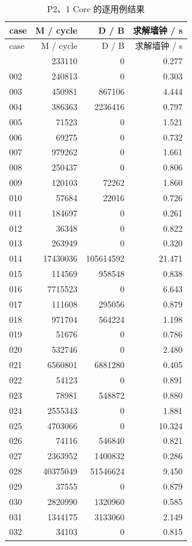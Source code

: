 \documentclass[anonymous,notoc]{gmcm2026}
\begin{document}
\begin{longtable}{lrrr}
\caption{P2、1 Core 的逐用例结果}\\
\toprule
case & M / cycle & D / B & 求解墙钟 / s\\\midrule
\endfirsthead
\toprule
case & M / cycle & D / B & 求解墙钟 / s\\\midrule
\endhead
\bottomrule\endfoot
001 & 233110 & 0 & 0.277 \\
002 & 240813 & 0 & 0.303 \\
003 & 450981 & 867106 & 4.444 \\
004 & 386363 & 2236416 & 0.797 \\
005 & 71523 & 0 & 1.521 \\
006 & 69275 & 0 & 0.732 \\
007 & 979262 & 0 & 1.661 \\
008 & 250437 & 0 & 0.806 \\
009 & 120103 & 72262 & 1.860 \\
010 & 57684 & 22016 & 0.726 \\
011 & 184697 & 0 & 0.261 \\
012 & 36348 & 0 & 0.822 \\
013 & 263949 & 0 & 0.320 \\
014 & 17430036 & 105614592 & 21.471 \\
015 & 114569 & 958548 & 0.838 \\
016 & 7715523 & 0 & 6.643 \\
017 & 111608 & 295056 & 0.879 \\
018 & 971704 & 564224 & 1.198 \\
019 & 51676 & 0 & 0.786 \\
020 & 532746 & 0 & 2.480 \\
021 & 6560801 & 6881280 & 0.405 \\
022 & 54123 & 0 & 0.891 \\
023 & 78981 & 548872 & 0.880 \\
024 & 2555343 & 0 & 1.881 \\
025 & 4703066 & 0 & 10.324 \\
026 & 74116 & 546840 & 0.821 \\
027 & 2363952 & 1400832 & 0.286 \\
028 & 40375049 & 51546624 & 9.450 \\
029 & 37555 & 0 & 0.879 \\
030 & 2820990 & 1320960 & 0.585 \\
031 & 1344175 & 3133060 & 2.149 \\
032 & 34103 & 0 & 0.815 \\

\end{longtable}
\end{document}
